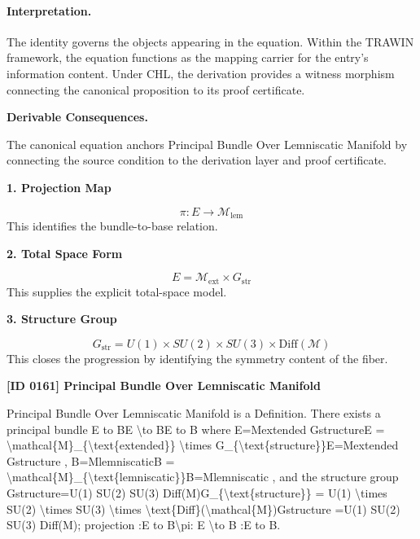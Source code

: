\paragraph{Interpretation.}
The identity governs the objects appearing in the equation. Within the TRAWIN framework, the equation functions as the mapping carrier for the entry’s information content. Under CHL, the derivation provides a witness morphism connecting the canonical proposition to its proof certificate.

\par\vspace{0.35em}
\noindent\textbf{Derivable Consequences.}\quad
\begingroup
\footnotesize
\raggedright
The canonical equation anchors Principal Bundle Over Lemniscatic Manifold by connecting the source condition to the derivation layer and proof certificate.
\par\endgroup

\noindent\textbf{1. Projection Map}\par
\[
\pi:E\to \mathcal{M}_{\mathrm{lem}}
\]
\noindent This identifies the bundle-to-base relation.\par
\noindent\textbf{2. Total Space Form}\par
\[
E=\mathcal{M}_{\mathrm{ext}}\times G_{\mathrm{str}}
\]
\noindent This supplies the explicit total-space model.\par
\noindent\textbf{3. Structure Group}\par
\[
G_{\mathrm{str}}=U(1)\times SU(2)\times SU(3)\times \mathrm{Diff}(\mathcal{M})
\]
\noindent This closes the progression by identifying the symmetry content of the fiber.\par

\clearpage
\noindent\textbf{[ID 0161] Principal Bundle Over Lemniscatic Manifold}\par
\vspace{0.35em}
\begingroup\small
{}
Principal Bundle Over Lemniscatic Manifold is a Definition. There exists a principal bundle E to BE \textbackslash{}to BE to B where E=Mextended GstructureE = \textbackslash{}mathcal\{M\}\_\{\textbackslash{}text\{extended\}\} \textbackslash{}times G\_\{\textbackslash{}text\{structure\}\}E=Mextended  Gstructure , B=MlemniscaticB = \textbackslash{}mathcal\{M\}\_\{\textbackslash{}text\{lemniscatic\}\}B=Mlemniscatic , and the structure group Gstructure=U(1) SU(2) SU(3) Diff(M)G\_\{\textbackslash{}text\{structure\}\} = U(1) \textbackslash{}times SU(2) \textbackslash{}times SU(3) \textbackslash{}times \textbackslash{}text\{Diff\}(\textbackslash{}mathcal\{M\})Gstructure =U(1) SU(2) SU(3) Diff(M); projection  :E to B\textbackslash{}pi: E \textbackslash{}to B :E to B.

